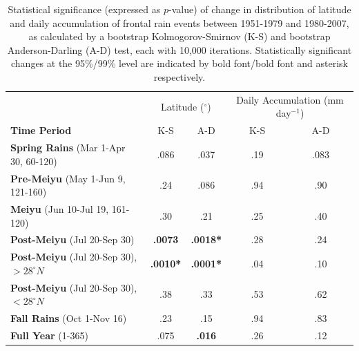 \documentclass[singlecolumn,11pt]{pnas-new}
\begin{document}
\begin{table}[p]

\centering

\caption{Statistical significance (expressed as $p$-value) of change in distribution of latitude and daily accumulation of frontal rain events between 1951-1979 and 1980-2007, as calculated by a bootstrap Kolmogorov-Smirnov (K-S) and bootstrap Anderson-Darling (A-D) test, each with 10,000 iterations. Statistically significant changes at the 95\%/99\% level are indicated by bold font/bold font and asterisk respectively.}

\begin{tabular}{ l c c c c}
												& \multicolumn{2}{c}{Latitude ($^\circ$)} & \multicolumn{2}{c}{Daily Accumulation  (mm day$^{-1}$)} \\
	 \textbf{Time Period} 							& K-S 			& A-D 			& K-S 	& A-D \\
	 \hline
	\textbf{Spring Rains} (Mar 1-Apr 30, 60-120)  		& .086			& .037			& .19	& .083 \\
	\textbf{Pre-Meiyu} (May 1-Jun 9, 121-160)  		& .24 			&  .086 			& .94	& .90 \\
	\textbf{Meiyu} (Jun 10-Jul 19, 161-120)			& .30			&  .21			&  .25	& .40 \\	
	\textbf{Post-Meiyu} (Jul 20-Sep 30) 				& \textbf{.0073}	&  \textbf{.0018*}  	&  .28 	& .24 \\
	\textbf{Post-Meiyu} (Jul 20-Sep 30), $>28^{\circ}N$   & \textbf{.0010*}	&  \textbf{.0001*} 	&  .04 	& .10 \\	
	\textbf{Post-Meiyu} (Jul 20-Sep 30), $<28^{\circ}N$   & .38			&  .33			&  .53	& .62 \\	
	\textbf{Fall Rains} (Oct 1-Nov 16) 					& .23 			&  .15			&  .94 	& .83 \\	
	\textbf{Full Year} (1-365)						& .075			&  \textbf{.016} 	&  .26 	& .12 \\	
	
\end{tabular}
\label{tab:s1}
\end{table}
\end{document}
